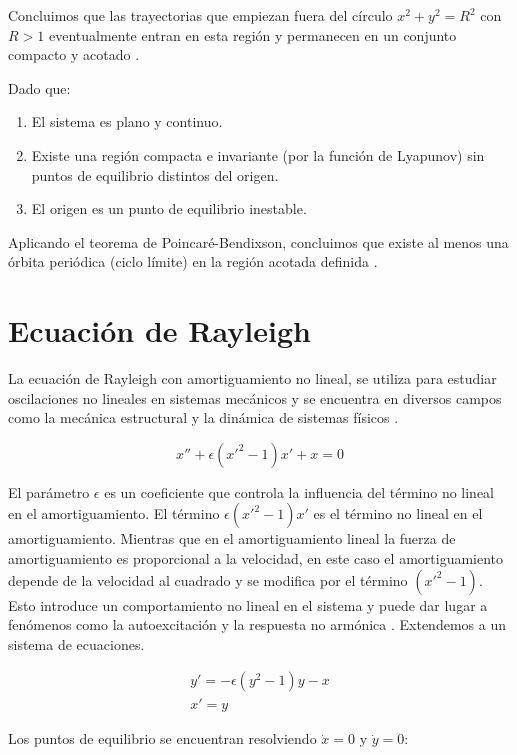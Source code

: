 Concluimos que las trayectorias que empiezan fuera del círculo \( x^2 + y^2 = R^2 \) con \( R > 1 \) eventualmente entran en esta región y permanecen en un conjunto compacto y acotado \cite{hahn1967stability}.

Dado que:

\begin{enumerate}
    \item El sistema es plano y continuo.
    \item Existe una región compacta e invariante (por la función de Lyapunov) sin puntos de equilibrio distintos del origen.
    \item El origen es un punto de equilibrio inestable.
\end{enumerate}

Aplicando el teorema de Poincaré-Bendixson, concluimos que existe al menos una órbita periódica (ciclo límite) en la región acotada definida \cite{lasalle1961stability}.
\section{Ecuación de Rayleigh}
La ecuación de Rayleigh con amortiguamiento no lineal, se utiliza
para estudiar oscilaciones no lineales en sistemas mecánicos y se encuentra en
diversos campos como la mecánica estructural y la dinámica de sistemas físicos \cite{rayleigh1883theory}.

$$x''+\epsilon(x'^2-1)x'+x=0$$

El parámetro $\epsilon$ es un coeficiente que controla la influencia del término no lineal en el amortiguamiento.
El término $\epsilon(x'^2 - 1)x'$ es el término no lineal en el amortiguamiento. Mientras que en el amortiguamiento
lineal la fuerza de amortiguamiento es proporcional a la velocidad, en este caso el amortiguamiento depende de
la velocidad al cuadrado y se modifica por el término $(x'^2 - 1)$. Esto introduce un comportamiento no lineal en el
sistema y puede dar lugar a fenómenos como la autoexcitación y la respuesta no armónica \cite{strogatz2018nonlinear}.
Extendemos a un sistema de ecuaciones.

\begin{equation}\label{eq: Rayleigh}
	\begin{matrix}
		y'=-\epsilon(y^2-1)y-x \\ 
		x'=y
	\end{matrix}
\end{equation}

Los puntos de equilibrio se encuentran resolviendo \(\dot{x} = 0\) y \(\dot{y} = 0\):

